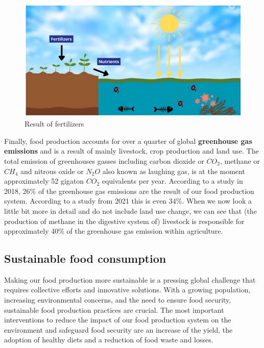 \documentclass[../summary.tex]{subfiles}
\begin{document}
	\begin{figure}[htbp]
		\centering
		\includegraphics[width=1\linewidth]{images/6-result-of-fertilizers.png}
		\caption{Result of fertilizers}
		\label{fig:result-of-fertilizers}
	\end{figure}
	
	Finally, food production accounts for over a quarter of global \textbf{greenhouse gas emissions} and is a result of mainly livestock, crop production and land use. The total emission of greenhouses gasses including carbon dioxide or $CO_{2}$, methane or $CH_{4}$ and nitrous oxide or $N_{2}O$ also known as laughing gas, is at the moment approximately 52 gigaton  $CO_{2}$ equivalents per year. According to a study in 2018, 26\% of the greenhouse gas emissions are the result of our food production system. According to a study from 2021 this is even 34\%. When we now look a little bit more in detail and do not include land use change, we can see that (the production of methane in the digestive system of) livestock is responsible for approximately 40\% of the greenhouse gas emission within agriculture.
	
	\subsection{Sustainable food consumption}
	
	Making our food production more sustainable is a pressing global challenge that requires collective efforts and innovative solutions. With a growing population, increasing environmental concerns, and the need to ensure food security, sustainable food production practices are crucial. The most important interventions to reduce the impact of our food production system on the environment and safeguard food security are an increase of the yield, the adoption of healthy diets and a reduction of food waste and losses. 
	
\end{document}
